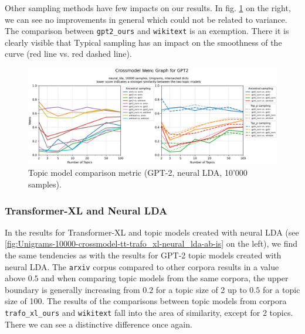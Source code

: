 Other sampling methods have few impacts on our results. In fig. \ref{fig:Unigrams-10000-crossmodel-tt-gpt2-neural_lda-ab-is} on the right, we can see no improvements in general which could not be related to variance. The comparison between \texttt{gpt2\_ours} and \texttt{wikitext} is an exemption. There it is clearly visible that Typical sampling has an impact on the smoothness of the curve (red line vs. red dashed line).  
\begin{figure}[H]
    \centering
    \includegraphics[width=1\textwidth]{figures/Unigrams-10000-crossmodel-tt-gpt2-neural_lda-ab-is}
    \caption{Topic model comparison metric (GPT-2, neural LDA, 10'000 samples).}
    \label{fig:Unigrams-10000-crossmodel-tt-gpt2-neural_lda-ab-is}
\end{figure}

\subsubsection{Transformer-XL and Neural LDA}
In the results for Transformer-XL and topic models created with neural LDA (see \ref{fig:Unigrams-10000-crossmodel-tt-trafo_xl-neural_lda-ab-is} on the left), we find the same tendencies as with the results for GPT-2 topic models created with neural LDA. The \texttt{arxiv} corpus compared to other corpora results in a value above $0.5$ and when comparing topic models from the same corpora, the upper boundary is generally increasing from $0.2$ for a topic size of 2 up to $0.5$ for a topic size of 100. The results of the comparisons between topic models from corpora \texttt{trafo\_xl\_ours} and \texttt{wikitext} fall into the area of similarity, except for 2 topics. There we can see a distinctive difference once again.

